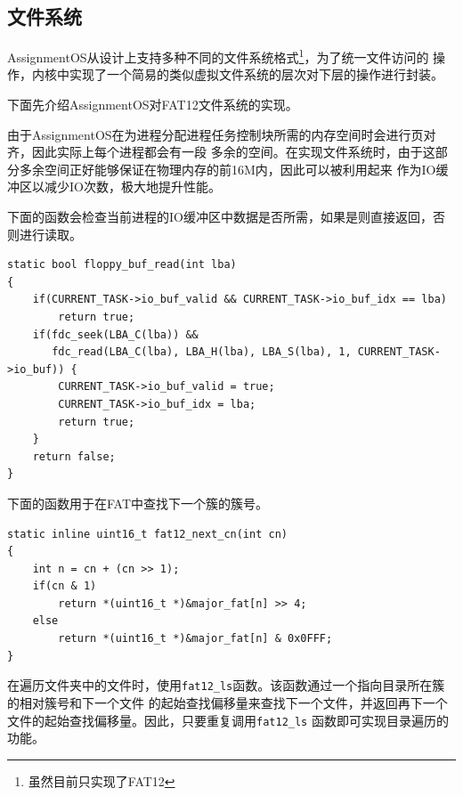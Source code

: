 \documentclass[a4paper, adobefonts]{ctexart}
\begin{document}
\subsection{文件系统}
AssignmentOS从设计上支持多种不同的文件系统格式\footnote{虽然目前只实现了FAT12}，为了统一文件访问的
操作，内核中实现了一个简易的类似虚拟文件系统的层次对下层的操作进行封装。

下面先介绍AssignmentOS对FAT12文件系统的实现。

由于AssignmentOS在为进程分配进程任务控制块所需的内存空间时会进行页对齐，因此实际上每个进程都会有一段
多余的空间。在实现文件系统时，由于这部分多余空间正好能够保证在物理内存的前16M内，因此可以被利用起来
作为IO缓冲区以减少IO次数，极大地提升性能。

下面的函数会检查当前进程的IO缓冲区中数据是否所需，如果是则直接返回，否则进行读取。

\begin{verbatim}
static bool floppy_buf_read(int lba)
{
    if(CURRENT_TASK->io_buf_valid && CURRENT_TASK->io_buf_idx == lba)
        return true;
    if(fdc_seek(LBA_C(lba)) &&
       fdc_read(LBA_C(lba), LBA_H(lba), LBA_S(lba), 1, CURRENT_TASK->io_buf)) {
        CURRENT_TASK->io_buf_valid = true;
        CURRENT_TASK->io_buf_idx = lba;
        return true;
    }
    return false;
}
\end{verbatim}

下面的函数用于在FAT中查找下一个簇的簇号。

\begin{verbatim}
static inline uint16_t fat12_next_cn(int cn)
{
    int n = cn + (cn >> 1);
    if(cn & 1)
        return *(uint16_t *)&major_fat[n] >> 4;
    else
        return *(uint16_t *)&major_fat[n] & 0x0FFF;
}
\end{verbatim}

在遍历文件夹中的文件时，使用\verb|fat12_ls|函数。该函数通过一个指向目录所在簇的相对簇号和下一个文件
的起始查找偏移量来查找下一个文件，并返回再下一个文件的起始查找偏移量。因此，只要重复调用\verb|fat12_ls|
函数即可实现目录遍历的功能。
\end{document}
